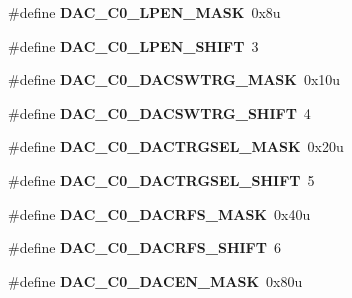 \begin{DoxyCompactItemize}
\#define {\bfseries D\+A\+C\+\_\+\+C0\+\_\+\+L\+P\+E\+N\+\_\+\+M\+A\+SK}~0x8u
\item 
\mbox{\label{group___d_a_c___register___masks_ga97aaa812a3938df3559cb40b893db431}} 
\#define {\bfseries D\+A\+C\+\_\+\+C0\+\_\+\+L\+P\+E\+N\+\_\+\+S\+H\+I\+FT}~3
\item 
\mbox{\label{group___d_a_c___register___masks_ga7e785d90fec3c1817fc53fea41f41644}} 
\#define {\bfseries D\+A\+C\+\_\+\+C0\+\_\+\+D\+A\+C\+S\+W\+T\+R\+G\+\_\+\+M\+A\+SK}~0x10u
\item 
\mbox{\label{group___d_a_c___register___masks_ga25e2afd71ee5cc41adde6f072c9d2604}} 
\#define {\bfseries D\+A\+C\+\_\+\+C0\+\_\+\+D\+A\+C\+S\+W\+T\+R\+G\+\_\+\+S\+H\+I\+FT}~4
\item 
\mbox{\label{group___d_a_c___register___masks_gac6dd81bc6500fc4b972c62bde339f31d}} 
\#define {\bfseries D\+A\+C\+\_\+\+C0\+\_\+\+D\+A\+C\+T\+R\+G\+S\+E\+L\+\_\+\+M\+A\+SK}~0x20u
\item 
\mbox{\label{group___d_a_c___register___masks_ga32f43711fa193364231213bd67c989f4}} 
\#define {\bfseries D\+A\+C\+\_\+\+C0\+\_\+\+D\+A\+C\+T\+R\+G\+S\+E\+L\+\_\+\+S\+H\+I\+FT}~5
\item 
\mbox{\label{group___d_a_c___register___masks_gadc1973eafb50599b83de95422477a1f5}} 
\#define {\bfseries D\+A\+C\+\_\+\+C0\+\_\+\+D\+A\+C\+R\+F\+S\+\_\+\+M\+A\+SK}~0x40u
\item 
\mbox{\label{group___d_a_c___register___masks_ga495d0702c9899844340d198120a77e33}} 
\#define {\bfseries D\+A\+C\+\_\+\+C0\+\_\+\+D\+A\+C\+R\+F\+S\+\_\+\+S\+H\+I\+FT}~6
\item 
\mbox{\label{group___d_a_c___register___masks_ga6865b52ae9a9275ef4db48eb3eb5d62a}} 
\#define {\bfseries D\+A\+C\+\_\+\+C0\+\_\+\+D\+A\+C\+E\+N\+\_\+\+M\+A\+SK}~0x80u
\item 
\mbox{\label{group___d_a_c___register___masks_gae8835f0083d5a4e588402a32047e95cb}} 

\end{DoxyCompactItemize}
